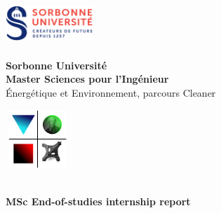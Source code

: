 \documentclass[11pt, a4paper, English]{report}
\begin{document}
\begin{titlepage}
\begin{center}
	\begin{minipage}{2.5cm}
	\begin{center}
		\includegraphics[width=3.3cm,height=1.7cm]{logo.png}
		
	\end{center}
\end{minipage}\hfill
\begin{minipage}{10cm}
	\begin{center}
	\textbf{ Sorbonne Université}\\[0.1cm]
    \textbf{Master Sciences pour l'Ingénieur}\\[0.1cm]
    Énergétique et Environnement, parcours Cleaner
		
	\end{center}
\end{minipage}\hfill
\begin{minipage}{2.5cm}
	\begin{center}
		\includegraphics[width=2.4cm,height=2.2cm]{logo2}
	\end{center}

\end{minipage}
\textsc{\Large }\\[6cm]
{\Large \bfseries MSc End-of-studies internship report}\\[0.5cm]




\end{center}
\end{titlepage}
\end{document}
